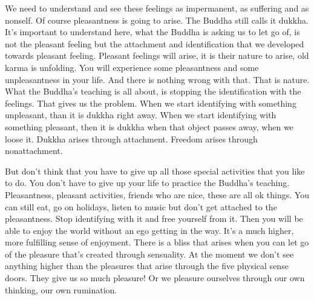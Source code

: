 \documentclass[letterpaper,10pt,english]{sphinxmanual}
\begin{document}
\sphinxAtStartPar
We need to understand and see these feelings as impermanent, as suffering   and as non\sphinxhyphen{}self. Of course pleasantness is going to arise. The Buddha
still calls it dukkha. It’s important to understand here, what the Buddha is
asking  us  to  let  go  of,  is  not  the  pleasant  feeling  but  the  attachment  and
identification that we developed towards pleasant feeling. Pleasant feelings
will arise, it is their nature to arise, old karma is unfolding. You will experience some pleasantness and some unpleasantness in your life. And there
is nothing wrong with that. That is nature. What the Buddha’s teaching is
all about, is stopping the identification with the feelings. That gives us the
problem.  When  we  start  identifying  with  something  unpleasant,  than  it  is
dukkha right away. When we start identifying with something pleasant, then
it is dukkha when that object passes away, when we loose it. Dukkha arises
through attachment. Freedom arises through non\sphinxhyphen{}attachment.

\sphinxAtStartPar
But don’t think that you have to give up all those special activities that
you like to do. You don’t have to give up your life to practice the Buddha’s
teaching.  Pleasantness,  pleasant  activities,  friends  who  are  nice,  these  are
all ok things. You can still eat, go on holidays, listen to music but don’t get
attached to the pleasantness. Stop identifying with it and free yourself from
it. Then you will be able to enjoy the world without an ego getting in the
way. It’s a much higher, more fulfilling sense of enjoyment. There is a bliss
that arises when you can let go of the pleasure that’s created through sensuality. At the moment we don’t see anything higher than the pleasures that arise
through the five physical sense doors. They give us so much pleasure! Or we
pleasure ourselves through our own thinking, our own rumination.
\end{document}

